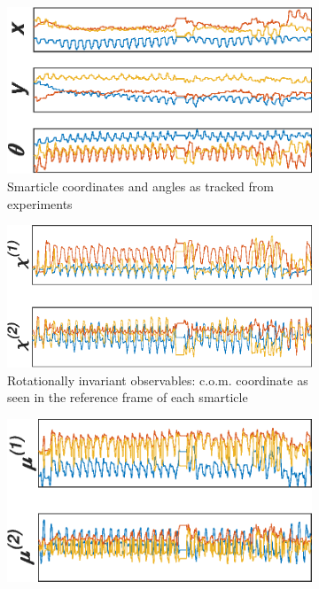 \documentclass[reprint,prx]{revtex4-1}
\renewcommand{\=}[1]{\stackrel{#1}{=}} %
\renewcommand{\(}{\left (}
\renewcommand{\)}{\right  )}
\renewcommand{\[}{\left [}
\renewcommand{\]}{\right ]}
\newcommand{\<}{\left <}
\renewcommand{\>}{\right >}
\theoremstyle{definition}
\theoremstyle{remark}
\begin{document}
\begin{figure} 
	\begin{subfigure}[t]{0.4\textwidth}
		\includegraphics[width=1\textwidth]{crdDat.eps}
\caption{Smarticle coordinates and angles as tracked from experiments \label{fig:crdDat}}
	\end{subfigure}
	\begin{subfigure}[t]{0.4\textwidth}
	\includegraphics[width=1\textwidth]{relDat.eps}
	\caption{Rotationally invariant observables: c.o.m. coordinate as seen in the reference frame of each smarticle \label{fig:relDat}}
	\end{subfigure}
	\begin{subfigure}[t]{0.4\textwidth}
	\includegraphics[width=1\textwidth]{piDat.eps}

\end{subfigure}
\end{figure}
\end{document}
